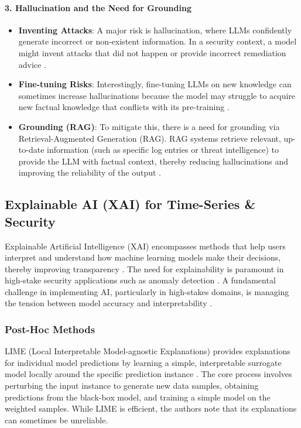 \paragraph{3. Hallucination and the Need for Grounding}
\begin{itemize}
    \item \textbf{Inventing Attacks}: A major risk is hallucination, where LLMs confidently generate incorrect or non-existent information. In a security context, a model might invent attacks that did not happen or provide incorrect remediation advice \cite{PrivateTransformerInference}.
    \item \textbf{Fine-tuning Risks}: Interestingly, fine-tuning LLMs on new knowledge can sometimes increase hallucinations because the model may struggle to acquire new factual knowledge that conflicts with its pre-training \cite{LLMLogAnomaly}. 
    \item \textbf{Grounding (RAG)}: To mitigate this, there is a need for grounding via Retrieval-Augmented Generation (RAG). RAG systems retrieve relevant, up-to-date information (such as specific log entries or threat intelligence) to provide the LLM with factual context, thereby reducing hallucinations and improving the reliability of the output \cite{alammar2024hands}.
\end{itemize}\subsection{Explainable AI (XAI) for Time-Series \& Security}

Explainable Artificial Intelligence (XAI) encompasses methods that help users interpret and understand how machine learning models make their decisions, thereby improving transparency \cite{XAImersha2024,hashemi2025}. The need for explainability is paramount in high-stake security applications such as anomaly detection \cite{SoKBhusal_2023,hashemi2025}. A fundamental challenge in implementing AI, particularly in high-stakes domains, is managing the tension between model accuracy and interpretability \cite{Unified}.

\subsubsection{Post-Hoc Methods}
LIME (Local Interpretable Model-agnostic Explanations) provides explanations for individual model predictions by learning a simple, interpretable surrogate model locally around the specific prediction instance \cite{WhyShouldITrustYou}. The core process involves perturbing the input instance to generate new data samples, obtaining predictions from the black-box model, and training a simple model on the weighted samples. While LIME is efficient, the authors note that its explanations can sometimes be unreliable.

